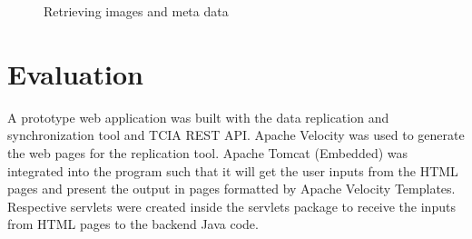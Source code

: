 \documentclass[conference]{IEEEtran}
\begin{document}
\begin{figure}[!h]
\begin{center}
\end{center}
 \caption{Retrieving images and meta data}
 \label{fig:methods}
\end{figure}



\section{Evaluation}
A prototype web application was built with the data replication and synchronization tool and TCIA REST API. Apache Velocity was used to generate the web pages for the replication tool. Apache Tomcat (Embedded) was integrated into the program such that it will get the user inputs from the HTML pages and present the output in pages formatted by Apache Velocity Templates. Respective servlets were created inside the servlets package to receive the inputs from HTML pages to the backend Java code.
\end{document}

